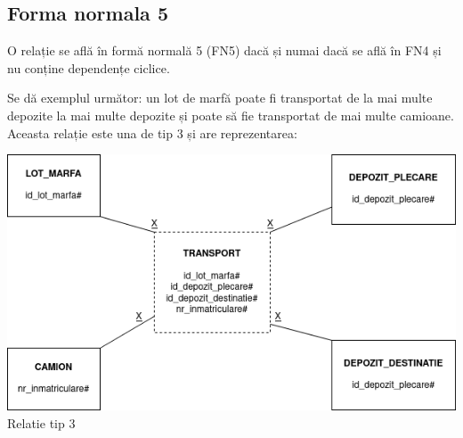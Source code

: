 \documentclass[12pt, a4paper]{article}
\begin{document}
\begin{table}[!htbp]
\begin{center}
    \caption{Relația \emph{transport2}}\label{tab14-2}
\end{center}
\end{table}

\begin{table}[!htbp]
\begin{center}
    \caption{Relația \emph{transport3}}\label{tab14-3}
\end{center}
\end{table}

\newpage

\subsection*{Forma normala 5}
O relație se află în formă normală 5 (FN5) dacă și numai dacă se află în FN4 și nu conține dependențe ciclice.

Se dă exemplul următor: un lot de marfă poate fi transportat de la mai multe depozite la mai multe depozite și poate să fie transportat de mai multe camioane. Aceasta relație este una de tip 3 și are reprezentarea:

\includegraphics[width=\textwidth]{fn5_rel_3.png}
\label{rel3}
\centering Relatie tip 3
\end{document}
